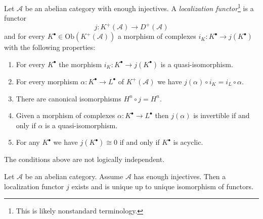 \begin{definition}
\label{definition-localization-functor}
Let $\mathcal{A}$ be an abelian category with enough injectives.
A {\it localization functor}\footnote{This is likely nonstandard terminology.}
is a functor
$$
j : K^{+}(\mathcal{A}) \longrightarrow D^{+}(\mathcal{A})
$$
and for every $K^\bullet \in \text{Ob}(K^{+}(\mathcal{A}))$ a
morphism of complexes $i_K : K^\bullet \to j(K^\bullet)$
with the following properties:
\begin{enumerate}
\item For every $K^\bullet$ the morphism $i_K : K^\bullet \to j(K^\bullet)$
is a quasi-isomorphism.
\item For every morphism $\alpha : K^\bullet \to L^\bullet$ of
$K^{+}(\mathcal{A})$ we have $j(\alpha) \circ i_K = i_L \circ \alpha$.
\item There are canonical isomorphisms $H^n \circ j = H^n$.
\item Given a morphism of complexes $\alpha : K^\bullet \to L^\bullet$
then $j(\alpha)$ is invertible if and only if $\alpha$ is a
quasi-isomorphism.
\item For any $K^\bullet$ we have $j(K^\bullet) \cong 0$ if and only
if $K^\bullet$ is acyclic.
\end{enumerate}
\end{definition}

\noindent
The conditions above are not logically independent.

\begin{lemma}
\label{lemma-into-derived-category}
Let $\mathcal{A}$ be an abelian category.
Assume $\mathcal{A}$ has enough injectives.
Then a localization functor $j$ exists and is 
unique up to unique isomorphism of functors.
\end{lemma}

